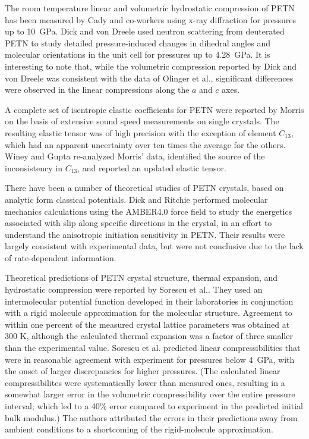\documentclass[prb,aps,nobibnotes,twocolumn,doublespace,twocolumngrid,superbib]{revtex4}
\begin{document}
The room temperature linear and volumetric hydrostatic compression
of PETN has been measured by Cady and co-workers\cite{Olinger_1975v62,Olinger_1976} 
using x-ray diffraction for pressures up to 10~GPa. 
Dick and von Dreele\cite{Dick_1997} used neutron scattering from deuterated
PETN to study detailed pressure-induced changes in dihedral angles and
molecular orientations in the unit cell for pressures up to 4.28~GPa. 
It is interesting to note that, while the volumetric compression reported
by Dick and von Dreele was consistent with the data of Olinger et al.,
significant differences were observed in the linear compressions along
the $a$ and $c$ axes.

A complete set of isentropic elastic coefficients for PETN were reported 
by Morris\cite{Morris_1976} on the basis
of extensive sound speed measurements on single crystals.  The resulting
elastic tensor was of high precision with the exception of element $C_{13}$,
which had an apparent uncertainty over ten times the average for the others.
Winey and Gupta\cite{Winey_2001v90} 
re-analyzed Morris' data, identified the source of the inconsistency in 
$C_{13}$, and reported an updated elastic tensor.

There have been a number of theoretical studies of PETN crystals, 
based on analytic form classical potentials.
 Dick and Ritchie\cite{Dick_1994,Ritchie_1993} performed molecular 
mechanics calculations using the AMBER4.0 force field to study the energetics 
associated with slip along specific directions in the crystal, in an effort 
to understand the anisotropic initiation sensitivity in PETN.  Their results 
were largely consistent with experimental data, but were not conclusive due 
to the lack of rate-dependent information.  

Theoretical predictions of PETN crystal structure, thermal expansion, and 
hydrostatic compression were reported by Sorescu et al.\cite{Sorescu_1999v103A,
Sorescu_1999v103}.  They used an intermolecular potential function developed 
in their laboratories in conjunction with a rigid molecule approximation for 
the molecular structure. Agreement to within one percent of the measured 
crystal lattice parameters was obtained at 300 K, although the calculated 
thermal expansion was a factor of three smaller than the experimental 
value.  Sorescu et al.  predicted linear compressibilities 
that were in reasonable agreement with experiment for pressures below 
4~GPa, with the onset of larger discrepancies for higher pressures.  (The 
calculated linear compressibilites were systematically lower than measured 
ones, resulting in a somewhat larger error in the volumetric compressibility 
over the entire pressure interval; which led to a 40\% error compared to 
experiment in the predicted initial bulk modulus.) The authors attributed 
the errors in their predictions away from ambient conditions to a shortcoming 
of the rigid-molecule approximation.
\end{document}

